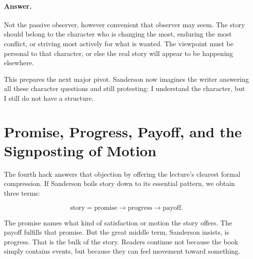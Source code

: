 \paragraph{Answer.} Not the passive observer, however convenient that observer may seem. The story should belong to the character who is changing the most, enduring the most conflict, or striving most actively for what is wanted. The viewpoint must be personal to that character, or else the real story will appear to be happening elsewhere.

This prepares the next major pivot. Sanderson now imagines the writer answering all these character questions and still protesting: I understand the character, but I still do not have a structure.

\section{Promise, Progress, Payoff, and the Signposting of Motion}

The fourth hack answers that objection by offering the lecture's clearest formal compression. If Sanderson boils story down to its essential pattern, we obtain three terms:

\begin{equation}
\text{story}=\text{promise} \to \text{progress} \to \text{payoff}.
\end{equation}

The promise names what kind of satisfaction or motion the story offers. The payoff fulfills that promise. But the great middle term, Sanderson insists, is progress. That is the bulk of the story. Readers continue not because the book simply contains events, but because they can feel movement toward something.

\begin{figure}
\centering
{}
\end{figure}


